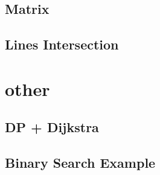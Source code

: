 \subsection{Matrix}


\subsection{Lines Intersection}

\section{other}

\subsection{DP + Dijkstra}


\subsection{Binary Search Example}

